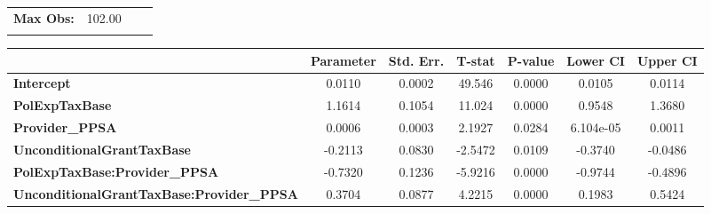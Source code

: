 \begin{center}
\begin{tabular}{lclc}
\textbf{Max Obs:}                                 &       102.00       & \textbf{                     }   &                  \\
\textbf{}                                         &                    & \textbf{                     }   &                  \\
\bottomrule
\end{tabular}
\begin{tabular}{lcccccc}
                                                  & \textbf{Parameter} & \textbf{Std. Err.} & \textbf{T-stat} & \textbf{P-value} & \textbf{Lower CI} & \textbf{Upper CI}  \\
\midrule
\textbf{Intercept}                                &       0.0110       &       0.0002       &      49.546     &      0.0000      &       0.0105      &       0.0114       \\
\textbf{PolExpTaxBase}                            &       1.1614       &       0.1054       &      11.024     &      0.0000      &       0.9548      &       1.3680       \\
\textbf{Provider\_PPSA}                           &       0.0006       &       0.0003       &      2.1927     &      0.0284      &     6.104e-05     &       0.0011       \\
\textbf{UnconditionalGrantTaxBase}                &      -0.2113       &       0.0830       &     -2.5472     &      0.0109      &      -0.3740      &      -0.0486       \\
\textbf{PolExpTaxBase:Provider\_PPSA}             &      -0.7320       &       0.1236       &     -5.9216     &      0.0000      &      -0.9744      &      -0.4896       \\
\textbf{UnconditionalGrantTaxBase:Provider\_PPSA} &       0.3704       &       0.0877       &      4.2215     &      0.0000      &       0.1983      &       0.5424       \\
\bottomrule
\end{tabular}
\end{center}